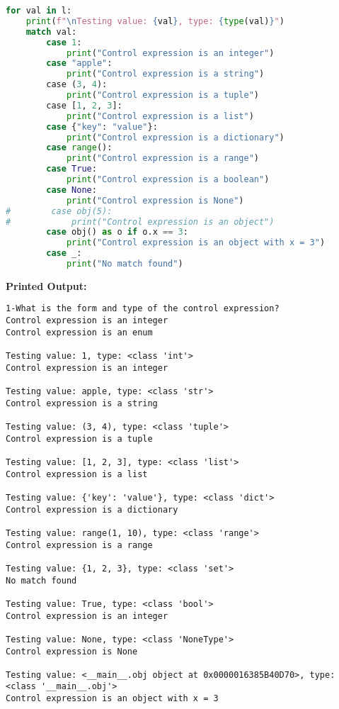\documentclass{article}
\begin{document}
\begin{itemize}
\begin{lstlisting}[language=Python]
for val in l:
    print(f"\nTesting value: {val}, type: {type(val)}")
    match val:
        case 1:
            print("Control expression is an integer")
        case "apple":
            print("Control expression is a string")
        case (3, 4):
            print("Control expression is a tuple")
        case [1, 2, 3]:
            print("Control expression is a list")
        case {"key": "value"}:
            print("Control expression is a dictionary")
        case range():
            print("Control expression is a range")
        case True:
            print("Control expression is a boolean")
        case None:
            print("Control expression is None")
#        case obj(5):
#            print("Control expression is an object")
        case obj() as o if o.x == 3:
            print("Control expression is an object with x = 3")
        case _:
            print("No match found")
\end{lstlisting}
\textbf{Printed Output:} 
\begin{verbatim}
1-What is the form and type of the control expression?
Control expression is an integer
Control expression is an enum

Testing value: 1, type: <class 'int'>
Control expression is an integer

Testing value: apple, type: <class 'str'>
Control expression is a string

Testing value: (3, 4), type: <class 'tuple'>
Control expression is a tuple

Testing value: [1, 2, 3], type: <class 'list'>
Control expression is a list

Testing value: {'key': 'value'}, type: <class 'dict'>
Control expression is a dictionary

Testing value: range(1, 10), type: <class 'range'>
Control expression is a range

Testing value: {1, 2, 3}, type: <class 'set'>
No match found

Testing value: True, type: <class 'bool'>
Control expression is an integer

Testing value: None, type: <class 'NoneType'>
Control expression is None

Testing value: <__main__.obj object at 0x0000016385B40D70>, type: <class '__main__.obj'>
Control expression is an object with x = 3
\end{verbatim}


\end{itemize}
\end{document}
